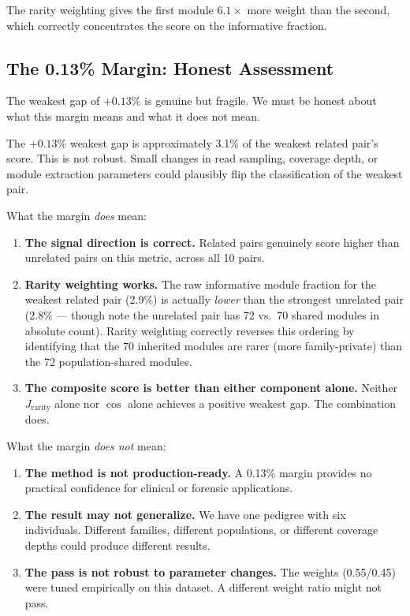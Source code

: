 \documentclass{../yalumba}
\begin{document}
The rarity weighting gives the first module $6.1\times$ more weight than the
second, which correctly concentrates the score on the informative fraction.

\subsection{The 0.13\% Margin: Honest Assessment}

The weakest gap of $+0.13\%$ is genuine but fragile.  We must be honest about
what this margin means and what it does not mean.

\begin{limitation}
The $+0.13\%$ weakest gap is approximately 3.1\% of the weakest related
pair's score.  This is not robust.  Small changes in read sampling, coverage
depth, or module extraction parameters could plausibly flip the classification
of the weakest pair.
\end{limitation}

What the margin \emph{does} mean:

\begin{enumerate}
  \item \textbf{The signal direction is correct.}  Related pairs genuinely
        score higher than unrelated pairs on this metric, across all 10 pairs.
  \item \textbf{Rarity weighting works.}  The raw informative module fraction
        for the weakest related pair (2.9\%) is actually \emph{lower} than the
        strongest unrelated pair (2.8\% --- though note the unrelated pair has
        72 vs.\ 70 shared modules in absolute count).  Rarity weighting
        correctly reverses this ordering by identifying that the 70 inherited
        modules are rarer (more family-private) than the 72 population-shared
        modules.
  \item \textbf{The composite score is better than either component alone.}
        Neither $J_{\text{rarity}}$ alone nor $\cos$ alone achieves a positive
        weakest gap.  The combination does.
\end{enumerate}

What the margin \emph{does not} mean:

\begin{enumerate}
  \item \textbf{The method is not production-ready.}  A 0.13\% margin
        provides no practical confidence for clinical or forensic applications.
  \item \textbf{The result may not generalize.}  We have one pedigree with
        six individuals.  Different families, different populations, or
        different coverage depths could produce different results.
  \item \textbf{The pass is not robust to parameter changes.}  The weights
        (0.55/0.45) were tuned empirically on this dataset.  A different
        weight ratio might not pass.
\end{enumerate}
\end{document}
